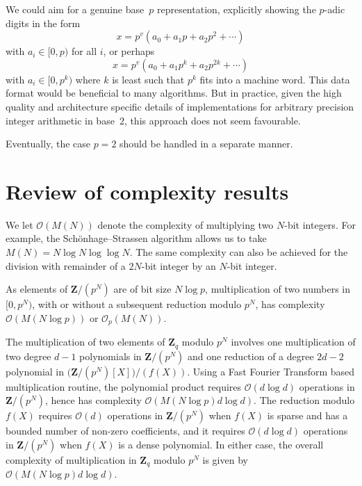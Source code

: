 \begin{rem}
We could aim for a genuine base~$p$ representation, explicitly showing 
the $p$-adic digits in the form 
\begin{equation}
x = p^v (a_0 + a_1 p + a_2 p^2 + \dotsb) 
\end{equation}
with $a_i \in [0,p)$ for all $i$, or perhaps 
\begin{equation}
x = p^v (a_0 + a_1 p^k + a_2 p^{2k} + \dotsb)
\end{equation}
with $a_i \in [0,p^k)$ where $k$ is least such that $p^{k}$ fits into 
a machine word.
This data format would be beneficial to many algorithms.  But in practice, 
given the high quality and architecture specific details of implementations 
for arbitrary precision integer arithmetic in base~$2$, this approach does 
not seem favourable.
\end{rem}

\begin{rem}
Eventually, the case $p = 2$ should be handled in a separate manner.
\end{rem}

\section{Review of complexity results}

We let $\mathcal{O}(M(N))$ denote the complexity of multiplying two 
$N$-bit integers.  For example, the Sch\"onhage--Strassen algorithm 
allows us to take $M(N) = N \log N \log \log N$.  The same 
complexity can also be achieved for the division with remainder of 
a $2N$-bit integer by an $N$-bit integer.

As elements of $\mathbf{Z} / (p^N)$ are of bit size $N \log p$, 
multiplication of two numbers in $[0, p^N)$, with or without a subsequent 
reduction modulo $p^N$, has complexity $\mathcal{O}(M(N \log p))$ or 
$\mathcal{O}_p(M(N))$.

The multiplication of two elements of $\mathbf{Z}_q$ modulo $p^N$ 
involves one multiplication of two degree $d-1$ polynomials in 
$\mathbf{Z}/(p^N)$ and one reduction of a degree $2d - 2$ polynomial 
in $\bigl( \mathbf{Z}/(p^N)[X] \bigr) / (f(X))$.   Using a Fast Fourier 
Transform based multiplication routine, the polynomial product requires 
$\mathcal{O}(d \log d)$ operations in $\mathbf{Z}/(p^N)$, hence has 
complexity $\mathcal{O}(M(N \log p) d \log d)$.  The reduction modulo $f(X)$ 
requires $\mathcal{O}(d)$ operations in $\mathbf{Z}/(p^N)$ when $f(X)$ is 
sparse and has a bounded number of non-zero coefficients, and it requires 
$\mathcal{O}(d \log d)$ operations in $\mathbf{Z}/(p^N)$ when $f(X)$ is 
a dense polynomial.  In either case, the overall complexity of multiplication 
in $\mathbf{Z}_q$ modulo $p^N$ is given by $\mathcal{O}(M(N \log p) d \log d)$.

